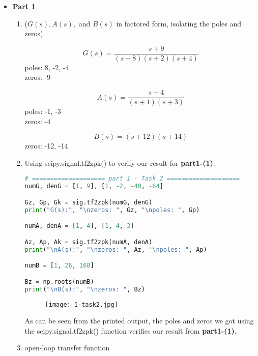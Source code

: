 \documentclass[12pt,a4paper]{article}
\begin{document}
\begin{itemize}

\item \textbf{Part 1}\\
\begin{enumerate}

    \item
    ($G(s), A(s),$ and $B(s)$ in factored form, isolating the poles and zeros)
    
    $$G(s) = \frac{s+9}{(s-8)(s+2)(s+4)}$$
    poles: 8, -2, -4\\
    zeros: -9
    
    $$A(s) = \frac{s+4}{(s+1)(s+3)}$$
    poles: -1, -3\\
    zeros: -4
    
    $$B(s) = (s+12)(s+14)$$
    zeros: -12, -14

    \item 
    Using scipy.signal.tf2zpk() to verify our result for \textbf{part1-(1)}.\\
    
\begin{lstlisting}[language=Python, caption={using scipy.signal.tf2zpk()}, label={lst:code}, mathescape=true, breaklines=true]
# ==================== part 1 - Task 2 ====================
numG, denG = [1, 9], [1, -2, -40, -64]

Gz, Gp, Gk = sig.tf2zpk(numG, denG)                  
print("G(s):", "\nzeros: ", Gz, "\npoles: ", Gp)

numA, denA = [1, 4], [1, 4, 3]

Az, Ap, Ak = sig.tf2zpk(numA, denA)
print("\nA(s):", "\nzeros: ", Az, "\npoles: ", Ap)

numB = [1, 26, 168]

Bz = np.roots(numB)
print("\nB(s):", "\nzeros: ", Bz)
\end{lstlisting}
    
\begin{figure}[h]
    \centering
    \texttt{[image: 1-task2.jpg]}
\end{figure}\textbf{}

As can be seen from the printed output, the poles and zeros we got using the scipy.signal.tf2zpk() function verifies our result from \textbf{part1-(1)}.\\

    \item
    open-loop transfer function
    

\end{enumerate}
\end{itemize}
\end{document}
